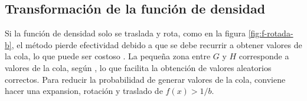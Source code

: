 \subsection{Transformación de la función de densidad}
% 
Si la función de densidad solo se traslada y rota, como en la figura \ref{fig:f-rotada-b}, el método pierde efectividad
debido a que se debe recurrir a obtener valores de la cola, lo que puede ser costoso \parencite{Marsaglia_1984}.
La pequeña zona entre $G$ y $H$ corresponde a valores de la cola, según \parencite{Marsaglia_1984}, lo que facilita la obtención de valores aleatorios correctos.
Para reducir la probabilidad de generar valores de la cola, conviene hacer una expansion, rotación y traslado de $f(x) > 1/b$.
\begin{figure}[ht!]
    \centering
\end{figure}
